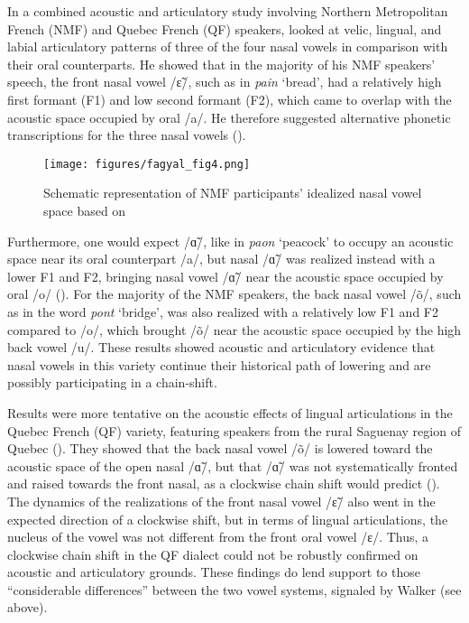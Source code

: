 \documentclass[output=paper,colorlinks,citecolor=brown]{langscibook}
\begin{document}
In a combined acoustic and articulatory study involving Northern Metropolitan French (NMF) and Quebec French (QF) speakers, \citet{Carignan2013} looked at velic, lingual, and labial articulatory patterns of three of the four nasal vowels in comparison with their oral counterparts. He showed that in the majority of his NMF speakers’ speech, the front nasal vowel /ɛ̃/, such as in \textit{pain} ‘bread’, had a relatively high first formant (F1) and low second formant (F2), which came to overlap with the acoustic space occupied by oral /a/. He therefore suggested alternative phonetic transcriptions for the three nasal vowels ().

\begin{figure}
    \texttt{[image: figures/fagyal\_fig4.png]}
    \caption{Schematic representation of NMF participants’ idealized nasal vowel space based on \citet{Carignan2013} }
    \label{fig:4}
\end{figure}

Furthermore, one would expect /ɑ̃/, like in \textit{paon} ‘peacock’ to occupy an acoustic space near its oral counterpart /a/, but nasal /ɑ̃/ was realized instead with a lower F1 and F2, bringing nasal vowel /ɑ̃/ near the acoustic space occupied by oral /o/ (). For the majority of the NMF speakers, the back nasal vowel /õ/, such as in the word \textit{pont} ‘bridge’, was also realized with a relatively low F1 and F2 compared to /o/, which brought /õ/ near the acoustic space occupied by the high back vowel /u/. These results showed acoustic and articulatory evidence that nasal vowels in this variety continue their historical path of lowering and are possibly participating in a chain-shift.

Results were more tentative on the acoustic effects of lingual articulations in the Quebec French (QF) variety, featuring speakers from the rural Saguenay region of Quebec (). They showed that the back nasal vowel /õ/ is lowered toward the acoustic space of the open nasal /ɑ̃/, but that /ɑ̃/ was not systematically fronted and raised towards the front nasal, as a clockwise chain shift would predict (). The dynamics of the realizations of the front nasal vowel /ɛ̃/ also went in the expected direction of a clockwise shift, but in terms of lingual articulations, the nucleus of the vowel was not different from the front oral vowel /ɛ/. Thus, a clockwise chain shift in the QF dialect could not be robustly confirmed on acoustic and articulatory grounds. These findings do lend support to those “considerable differences” between the two vowel systems, signaled by Walker (see above).
\end{document}
